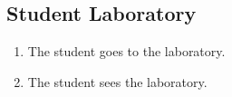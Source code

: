 \subsection{Student Laboratory}

\begin{enumerate}
    \item The student goes to the laboratory.
    \item The student sees the laboratory.
\end{enumerate}
